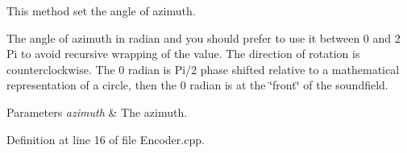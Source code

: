 This method set the angle of azimuth. 

The angle of azimuth in radian and you should prefer to use it between 0 and 2 Pi to avoid recursive wrapping of the value. The direction of rotation is counterclockwise. The 0 radian is Pi/2 phase shifted relative to a mathematical representation of a circle, then the 0 radian is at the \char`\"{}front\char`\"{} of the soundfield.


\begin{DoxyParams}{Parameters}
{\em azimuth} & The azimuth. \\
\hline
\end{DoxyParams}


Definition at line 16 of file Encoder.\-cpp.

